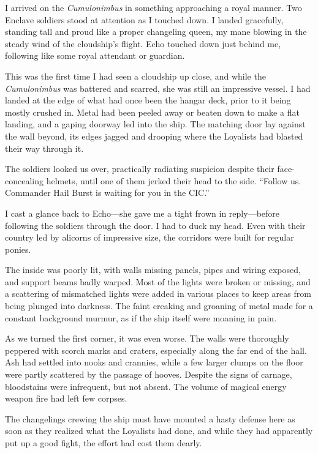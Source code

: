 I arrived on the \textit{Cumulonimbus} in something approaching a royal manner. Two Enclave soldiers stood at attention as I touched down. I landed gracefully, standing tall and proud like a proper changeling queen, my mane blowing in the steady wind of the cloudship’s flight. Echo touched down just behind me, following like some royal attendant or guardian.

This was the first time I had seen a cloudship up close, and while the \textit{Cumulonimbus} was battered and scarred, she was still an impressive vessel. I had landed at the edge of what had once been the hangar deck, prior to it being mostly crushed in. Metal had been peeled away or beaten down to make a flat landing, and a gaping doorway led into the ship. The matching door lay against the wall beyond, its edges jagged and drooping where the Loyalists had blasted their way through it.

The soldiers looked us over, practically radiating suspicion despite their face-concealing helmets, until one of them jerked their head to the side. “Follow us. Commander Hail Burst is waiting for you in the CIC.”

I cast a glance back to Echo—she gave me a tight frown in reply—before following the soldiers through the door. I had to duck my head. Even with their country led by alicorns of impressive size, the corridors were built for regular ponies.

The inside was poorly lit, with walls missing panels, pipes and wiring exposed, and support beams badly warped. Most of the lights were broken or missing, and a scattering of mismatched lights were added in various places to keep areas from being plunged into darkness. The faint creaking and groaning of metal made for a constant background murmur, as if the ship itself were moaning in pain.

As we turned the first corner, it was even worse. The walls were thoroughly peppered with scorch marks and craters, especially along the far end of the hall. Ash had settled into nooks and crannies, while a few larger clumps on the floor were partly scattered by the passage of hooves. Despite the signs of carnage, bloodstains were infrequent, but not absent. The volume of magical energy weapon fire had left few corpses.

The changelings crewing the ship must have mounted a hasty defense here as soon as they realized what the Loyalists had done, and while they had apparently put up a good fight, the effort had cost them dearly.

